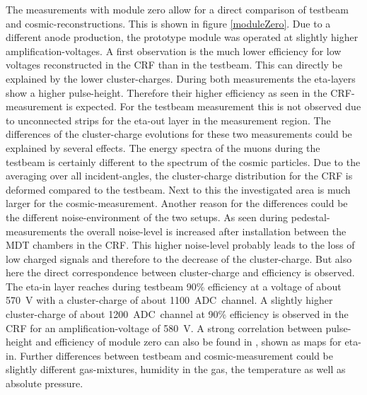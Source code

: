 \documentclass[
twoside,            %
BCOR1.4cm,          %
10pt,               %
headings=normal,    %
headsepline,        %
clearplainpage,		%
final,              %
div=14,
open=right,
bibliography=toc
]{scrreprt}
\begin{document}
The measurements with module zero allow for a direct comparison of testbeam and cosmic-reconstructions.
This is shown in figure \ref{moduleZero}.
Due to a different anode production, the prototype module was operated at slightly higher amplification-voltages.
A first observation is the much lower efficiency for low voltages reconstructed in the CRF than in the testbeam.
This can directly be explained by the lower cluster-charges.
During both measurements the eta-layers show a higher pulse-height.
Therefore their higher efficiency as seen in the CRF-measurement is expected.
For the testbeam measurement this is not observed due to unconnected strips for the eta-out layer in the measurement region.
The differences of the cluster-charge evolutions for these two measurements could be explained by several effects.
The energy spectra of the muons during the testbeam is certainly different to the spectrum of the cosmic particles.
Due to the averaging over all incident-angles, the cluster-charge distribution for the CRF is deformed compared to the testbeam.
Next to this the investigated area is much larger for the cosmic-measurement.
Another reason for the differences could be the different noise-environment of the two setups.
As seen during pedestal-measurements the overall noise-level is increased after installation between the MDT chambers in the CRF.
This higher noise-level probably leads to the loss of low charged signals and therefore to the decrease of the cluster-charge.
But also here the direct correspondence between cluster-charge and efficiency is observed.
The eta-in layer reaches during testbeam 90\% efficiency at a voltage of about \SI{570}{V} with a cluster-charge of about \SI{1100}{ADC channel}.
A slightly higher cluster-charge of about \SI{1200}{ADC channel} at 90\% efficiency is observed in the CRF for an amplification-voltage of \SI{580}{V}.
A strong correlation between pulse-height and efficiency of module zero can also be found in \cite{ICHEPpaper}, shown as maps for eta-in.
Further differences between testbeam and cosmic-measurement could be slightly different gas-mixtures, humidity in the gas, the temperature as well as absolute pressure.
\end{document}
